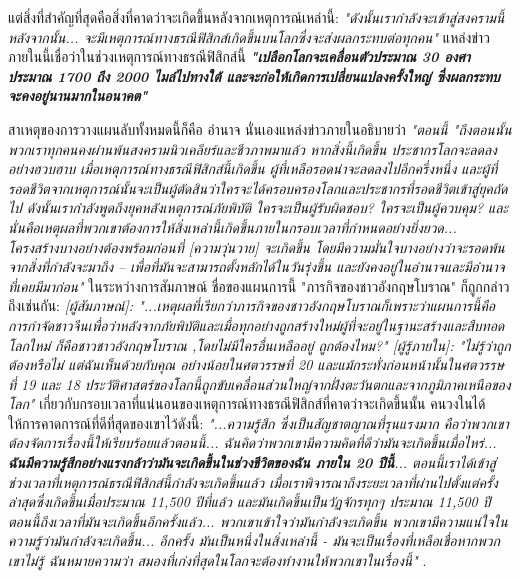 \documentclass[10pt,twocolumn,letterpaper]{article}
\begin{document}
แต่สิ่งที่สำคัญที่สุดคือสิ่งที่คาดว่าจะเกิดขึ้นหลังจากเหตุการณ์เหล่านี้: \textit{"ดังนั้นเรากำลังจะเข้าสู่สงครามนี้ หลังจากนั้น... จะมีเหตุการณ์ทางธรณีฟิสิกส์เกิดขึ้นบนโลกซึ่งจะส่งผลกระทบต่อทุกคน"} \cite{4} แหล่งข่าวภายในนี้เชื่อว่าในช่วงเหตุการณ์ทางธรณีฟิสิกส์นี้ \textit{\textbf{"เปลือกโลกจะเคลื่อนตัวประมาณ 30 องศา ประมาณ 1700 ถึง 2000 ไมล์ไปทางใต้ และจะก่อให้เกิดการเปลี่ยนแปลงครั้งใหญ่ ซึ่งผลกระทบจะคงอยู่นานมากในอนาคต"}} \cite{4}

สาเหตุของการวางแผนลับทั้งหมดนี้ก็คือ อำนาจ นั่นเองแหล่งข่าวภายในอธิบายว่า \textit{"ตอนนี้ "ถึงตอนนั้น พวกเราทุกคนคงผ่านพ้นสงครามนิวเคลียร์และชีวภาพมาแล้ว หากสิ่งนี้เกิดขึ้น ประชากรโลกจะลดลงอย่างฮวบฮาบ เมื่อเหตุการณ์ทางธรณีฟิสิกส์นี้เกิดขึ้น ผู้ที่เหลือรอดน่าจะลดลงไปอีกครึ่งหนึ่ง และผู้ที่รอดชีวิตจากเหตุการณ์นั้นจะเป็นผู้ตัดสินว่าใครจะได้ครอบครองโลกและประชากรที่รอดชีวิตเข้าสู่ยุคถัดไป ดังนั้นเรากำลังพูดถึงยุคหลังเหตุการณ์ภัยพิบัติ ใครจะเป็นผู้รับผิดชอบ? ใครจะเป็นผู้ควบคุม? และนั่นคือเหตุผลที่พวกเขาต้องการให้สิ่งเหล่านี้เกิดขึ้นภายในกรอบเวลาที่กำหนดอย่างยิ่งยวด... โครงสร้างบางอย่างต้องพร้อมก่อนที่ [ความวุ่นวาย] จะเกิดขึ้น โดยมีความมั่นใจบางอย่างว่าจะรอดพ้นจากสิ่งที่กำลังจะมาถึง – เพื่อที่มันจะสามารถตั้งหลักได้ในวันรุ่งขึ้น และยังคงอยู่ในอำนาจและมีอำนาจที่เคยมีมาก่อน"} \cite{4} ในระหว่างการสัมภาษณ์ ชื่อของแผนการนี้ "ภารกิจของชาวอังกฤษโบราณ" ก็ถูกกล่าวถึงเช่นกัน: \textit{[ผู้สัมภาษณ์]: "...เหตุผลที่เรียกว่าภารกิจของชาวอังกฤษโบราณก็เพราะว่าแผนการนี้คือการกำจัดชาวจีนเพื่อว่าหลังจากภัยพิบัติและเมื่อทุกอย่างถูกสร้างใหม่ผู้ที่จะอยู่ในฐานะสร้างและสืบทอดโลกใหม่ ก็คือชาวชาวอังกฤษโบราณ ,โดยไม่มีใครอื่นเหลืออยู่ ถูกต้องไหม?" [ผู้รู้ภายใน]: "ไม่รู้ว่าถูกต้องหรือไม่ แต่ฉันเห็นด้วยกับคุณ อย่างน้อยในศตวรรษที่ 20 และแม้กระทั่งก่อนหน้านั้นในศตวรรษที่ 19 และ 18 ประวัติศาสตร์ของโลกนี้ถูกขับเคลื่อนส่วนใหญ่จากฝั่งตะวันตกและจากภูมิภาคเหนือของโลก"} \cite{4}
เกี่ยวกับกรอบเวลาที่แน่นอนของเหตุการณ์ทางธรณีฟิสิกส์ที่คาดว่าจะเกิดขึ้นนั้น คนวงในได้ให้การคาดการณ์ที่ดีที่สุดของเขาไว้ดังนี้: \textit{"...ความรู้สึก ซึ่งเป็นสัญชาตญาณที่รุนแรงมาก  คือว่าพวกเขาต้องจัดการเรื่องนี้ให้เรียบร้อยแล้วตอนนี้... ฉันคิดว่าพวกเขามีความคิดที่ดีว่ามันจะเกิดขึ้นเมื่อไหร่... \textbf{ฉันมีความรู้สึกอย่างแรงกล้าว่ามันจะเกิดขึ้นในช่วงชีวิตของฉัน ภายใน 20 ปีนี้}... ตอนนี้เราได้เข้าสู่ช่วงเวลาที่เหตุการณ์ธรณีฟิสิกส์นี้กำลังจะเกิดขึ้นแล้ว เมื่อเราพิจารณาถึงระยะเวลาที่ผ่านไปตั้งแต่ครั้งล่าสุดซึ่งเกิดขึ้นเมื่อประมาณ 11,500 ปีที่แล้ว และมันเกิดขึ้นเป็นวัฏจักรทุกๆ ประมาณ 11,500 ปี ตอนนี้ถึงเวลาที่มันจะเกิดขึ้นอีกครั้งแล้ว... พวกเขาเข้าใจว่ามันกำลังจะเกิดขึ้น พวกเขามีความแน่ใจในความรู้ว่ามันกำลังจะเกิดขึ้น... อีกครั้ง มันเป็นหนึ่งในสิ่งเหล่านี้ - มันจะเป็นเรื่องที่เหลือเชื่อหากพวกเขาไม่รู้ ฉันหมายความว่า สมองที่เก่งที่สุดในโลกจะต้องทำงานให้พวกเขาในเรื่องนี้"} \cite{4}.
\end{document}

